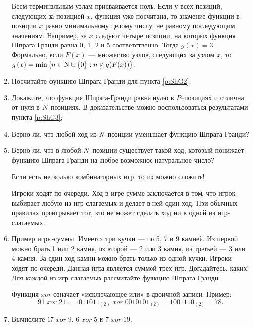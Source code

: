 \begin{problem}
\begin{enumerate}
Всем терминальным узлам присваивается ноль.
Если у всех позиций, следующих за позицией  $x$, функция уже посчитана, то значение функции в позиции  $x$  равно минимальному целому числу, не равному последующим значениям.
Например, за  $x$  следуют четыре позиции, на которых функция Шпрага-Гранди равна 0, 1, 2 и 5 соответственно. Тогда  $g\left(x\right)=3$. Формально, если  $F\left(x\right)$  — множество узлов, следующих за узлом  $x$, то  $g\left(x\right)=\min \left\{n\in {\rm N} \cup \left\{0\right\}: n \not \in g(F(x))\right\}$.
\item	Посчитайте функцию Шпрага-Гранди для пункта \ref{p:ShG2};\par
\item	Докажите, что функция Шпрага-Гранди равна нулю в  $P$--позициях и отлична от нуля в  $N$--позициях. В доказательстве можно воспользоваться результатами пункта \ref{p:ShG3};\par
\item	Верно ли, что любой ход из  $N$--позиции уменьшает функцию Шпрага-Гранди?\par
\item	Верно ли, что в любой  $N$--позиции существует такой ход, который понижает функцию Шпрага-Гранди на любое возможное натуральное число?\par
Если есть несколько комбинаторных игр, то их можно сложить! \par
Игроки ходят по очереди. Ход в игре-сумме заключается в том, что игрок выбирает любую из игр-слагаемых и делает в ней один ход. При обычных правилах проигрывает тот, кто не может сделать ход ни в одной из игр-слагаемых.\par
\item\label{p:ShG7}	Пример игры-суммы. Имеется три кучки — по 5, 7 и 9 камней. Из первой можно брать 1 или 2 камня, из второй — 2 или 3 камня, из третьей — 3 или 4 камня. За один ход камни можно брать только из одной кучки. Игроки ходят по очереди. Данная игра является суммой трех игр. Догадайтесь, каких! Для каждой из игр-слагаемых рассчитайте функцию Шпрага-Гранди.\par
Функция  $xor$  означает «исключающее или» в двоичной записи. Пример:
\[91\; xor\; 21=1011011_{\left(2\right)} \; xor\; 0010101_{\left(2\right)} =1001110_{\left(2\right)} =78.\]
\item	Вычислите  $17\; xor\; 9$,  $6\; xor\; 5$  и  $7\; xor\; 19.$ \par


\end{enumerate}
\end{problem}
